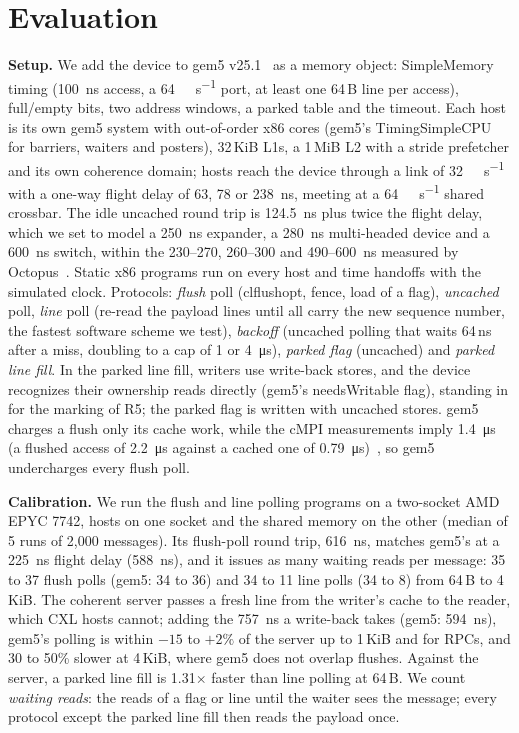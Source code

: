 \documentclass[journal]{IEEEtran}
\begin{document}
\section{Evaluation}
\label{sec:eval}
\textbf{Setup.} We add the device to gem5 v25.1~\cite{gem5} as a memory object: SimpleMemory timing
(\SI{100}{\nano\second} access, a \SI{64}{\gibi\byte\per\second} port, at least one 64\,B line per
access), full/empty bits, two address windows, a parked table and the timeout. Each host is its own
gem5 system with out-of-order x86 cores (gem5's TimingSimpleCPU for barriers, waiters and
posters), 32\,KiB L1s, a 1\,MiB L2 with a stride prefetcher and its own coherence domain; hosts reach
the device through a link of \SI{32}{\giga\byte\per\second} with a one-way flight delay of 63, 78 or
\SI{238}{\nano\second}, meeting at a
\SI{64}{\giga\byte\per\second} shared crossbar. The idle uncached round trip is
\SI{124.5}{\nano\second} plus twice the flight delay, which we set to model a
\SI{250}{\nano\second} expander, a \SI{280}{\nano\second} multi-headed device and a
\SI{600}{\nano\second} switch, within the 230--270, 260--300 and 490--\SI{600}{\nano\second}
measured by Octopus~\cite{octopus}. Static x86 programs run on every host and time handoffs with
the simulated clock. Protocols: \emph{flush} poll (clflushopt, fence, load of a flag),
\emph{uncached} poll, \emph{line} poll (re-read the payload lines until all carry the new sequence
number, the fastest software scheme we test), \emph{backoff} (uncached polling that waits 64\,ns after
a miss, doubling to a cap of 1 or \SI{4}{\micro\second}), \emph{parked flag} (uncached) and \emph{parked
line fill}. In the parked line fill, writers use write-back stores, and the device recognizes their
ownership reads directly (gem5's needsWritable flag), standing in for the marking of R5; the parked
flag is written with uncached stores. gem5 charges a flush only its cache work, while the cMPI
measurements imply \SI{1.4}{\micro\second} (a flushed access of \SI{2.2}{\micro\second}
against a cached one of \SI{0.79}{\micro\second})~\cite{cmpi}, so gem5 undercharges every flush poll.

\textbf{Calibration.} We run the flush and line polling programs on a two-socket AMD EPYC 7742,
hosts on one socket and the shared memory on the other (median of 5 runs of 2,000 messages). Its
flush-poll round trip, \SI{616}{\nano\second}, matches gem5's at a \SI{225}{\nano\second} flight delay
(\SI{588}{\nano\second}), and it issues as many waiting reads per message: 35 to 37 flush polls
(gem5: 34 to 36) and 34 to 11 line polls (34 to 8) from 64\,B to 4\,KiB. The coherent server passes a
fresh line from the writer's cache to the reader, which CXL hosts cannot; adding the
\SI{757}{\nano\second} a write-back takes (gem5: \SI{594}{\nano\second}), gem5's polling is within $-15$
to $+2\%$ of the server up to 1\,KiB and for RPCs, and 30 to 50\% slower at 4\,KiB, where gem5 does
not overlap flushes. Against the server, a parked line fill is 1.31$\times$ faster than line polling at 64\,B. We count \emph{waiting reads}: the reads of a flag or line until the
waiter sees the message; every protocol except the parked line fill then reads the payload once.
\end{document}

